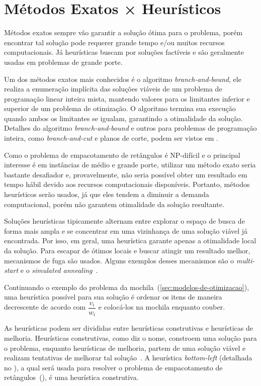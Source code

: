 \section{Métodos Exatos × Heurísticos}\label{sec:metodos-exatos-heuristicos}

Métodos exatos sempre vão garantir a solução ótima para o problema, porém encontrar
tal solução pode requerer grande tempo e/ou muitos recursos computacionais.
Já heurísticas buscam por soluções factíveis e são geralmente usadas em problemas de grande porte.

Um dos métodos exatos mais conhecidos é o algoritmo \textit{branch-and-bound}, ele realiza a
enumeração implícita das soluções viáveis de um problema de programação linear inteira mista,
mantendo valores para os limitantes inferior e superior de um problema de otimização.
O algoritmo termina sua execução quando ambos os limitantes se igualam, garantindo a otimalidade
da solução.
Detalhes do algoritmo \textit{branch-and-bound} e outros para problemas de programação inteira,
como \textit{branch-and-cut} e planos de corte, podem ser vistos em .

Como o problema de empacotamento de retângulos é NP-difícil e o principal interesse é em instâncias
de médio e grande porte, utilizar um método exato seria bastante desafiador e, provavelmente,
não seria possível obter um resultado em tempo hábil devido aos recursos computacionais disponíveis.
Portanto, métodos heurísticos serão usados, já que eles tendem a diminuir a demanda computacional,
porém não garantem otimalidade da solução resultante.

Soluções heurísticas tipicamente alternam entre explorar o espaço de busca de forma mais ampla
e se concentrar em uma vizinhança de uma solução viável já encontrada.
Por isso, em geral, uma heurística garante apenas a otimalidade local da solução.
Para escapar de ótimos locais e buscar atingir um resultado melhor, mecanismos de fuga são usados.
Alguns exemplos desses mecanismos são o \textit{multi-start} e o \textit{simulated annealing}~\cite{
    firat2020effective,rakotonirainy2020improved,hopper2001empirical}.

Continuando o exemplo do problema da mochila~(\cref{sec:modelos-de-otimizacao}), uma heurística
possível para sua solução é ordenar os itens de maneira decrescente de acordo com $\dfrac{v_i}{w_i}$
e colocá-los na mochila enquanto couber.

As heurísticas podem ser divididas entre heurísticas construtivas e heurísticas de melhoria.
Heurísticas construtivas, como diz o nome, constroem uma solução para o problema,
enquanto heurísticas de melhoria, partem de uma solução viável e realizam tentativas de
melhorar tal solução~\cite{michalewicz2013solve}.
A heurística \textit{bottom-left} (detalhada no ), a qual será usada para
resolver o problema de empacotamento de retângulos~(),
é uma heurística construtiva.